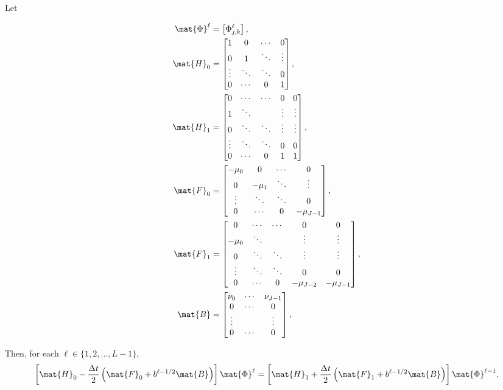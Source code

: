 \documentclass{jpmarticle}
\let\subequationsorig\subequations%
\let\endsubequationsorig\endsubequations%
\renewenvironment{subequations}{
  \subequationsorig
  \renewcommand{\theequation}{\theparentequation.\arabic{equation}}
}{
  \endsubequationsorig
}
\begin{document}
Let
\begin{subequations}
  \begin{align}
    \mat{\Phi}^{\ell}
    &= \left[\Phi_{j, k}^{\ell}\right],
    \\
    \mat{H}_0 &=
    \begin{bmatrix}
      1 & 0 & \cdots & 0
      \\
      0 & 1 & \ddots & \vdots
      \\
      \vdots & \ddots & \ddots & 0
      \\
      0 & \cdots & 0 & 1
    \end{bmatrix},
    \\
    \mat{H}_1 &=
    \begin{bmatrix}
      0 & \cdots & \cdots & 0 & 0
      \\
      1 & \ddots & & \vdots & \vdots
      \\
      0 & \ddots & \ddots & \vdots & \vdots
      \\
      \vdots & \ddots & \ddots & 0 & 0
      \\
      0 & \cdots & 0 & 1 & 1
    \end{bmatrix},
    \\
    \mat{F}_0 &=
    \begin{bmatrix}
      - \mu_0 & 0 & \cdots & 0
      \\
      0 & - \mu_1 & \ddots & \vdots
      \\
      \vdots & \ddots & \ddots & 0
      \\
      0 & \cdots & 0 & - \mu_{J - 1}
    \end{bmatrix},
    \\
    \mat{F}_1 &=
    \begin{bmatrix}
      0 & \cdots & \cdots & 0 & 0
      \\
      - \mu_0 & \ddots & & \vdots & \vdots
      \\
      0 & \ddots & \ddots & \vdots & \vdots
      \\
      \vdots & \ddots & \ddots & 0 & 0
      \\
      0 & \cdots & 0 & - \mu_{J - 2} & - \mu_{J - 1}
    \end{bmatrix},
    \\
    \mat{B} &=
    \begin{bmatrix}
      \nu_0 & \cdots & \nu_{J - 1} \\
      0 & \cdots & 0 \\
      \vdots & & \vdots \\
      0 & \cdots & 0
    \end{bmatrix},
    \\
  \end{align}
\end{subequations}
Then, for each $\ell \in \{1, 2, \ldots, L - 1\}$,
\begin{equation}
  \left[
    \mat{H}_0
    - \frac{\Delta t}{2}
    \left(
      \mat{F}_0
      + b^{\ell - 1 / 2} \mat{B}
    \right)
  \right]
  \mat{\Phi}^{\ell}
  =
  \left[
    \mat{H}_1
    + \frac{\Delta t}{2}
    \left(
      \mat{F}_1
      + b^{\ell - 1 / 2} \mat{B}
    \right)
  \right]
  \mat{\Phi}^{\ell - 1}.
\end{equation}
\end{document}
